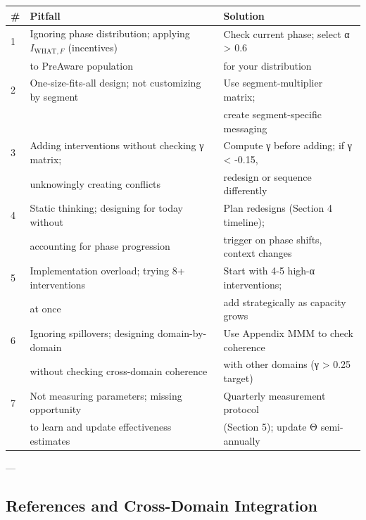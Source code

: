 \begin{center}
\begin{tabular}{@{}lp{8cm}l@{}}
\toprule
\textbf{\#} & \textbf{Pitfall} & \textbf{Solution} \\
\midrule
1 & Ignoring phase distribution; applying $I_{\text{WHAT},F}$ (incentives) & Check current phase; select α > 0.6 \\
  & to PreAware population & for your distribution \\
\midrule
2 & One-size-fits-all design; not customizing by segment & Use segment-multiplier matrix; \\
  & & create segment-specific messaging \\
\midrule
3 & Adding interventions without checking γ matrix; & Compute γ before adding; if γ < -0.15, \\
  & unknowingly creating conflicts & redesign or sequence differently \\
\midrule
4 & Static thinking; designing for today without & Plan redesigns (Section 4 timeline); \\
  & accounting for phase progression & trigger on phase shifts, context changes \\
\midrule
5 & Implementation overload; trying 8+ interventions & Start with 4-5 high-α interventions; \\
  & at once & add strategically as capacity grows \\
\midrule
6 & Ignoring spillovers; designing domain-by-domain & Use Appendix MMM to check coherence \\
  & without checking cross-domain coherence & with other domains (γ > 0.25 target) \\
\midrule
7 & Not measuring parameters; missing opportunity & Quarterly measurement protocol \\
  & to learn and update effectiveness estimates & (Section 5); update Θ semi-annually \\
\midrule
\end{tabular}
\end{center}

---


\subsection*{References and Cross-Domain Integration}

